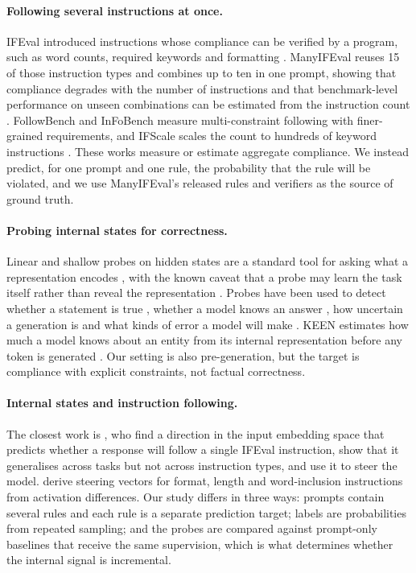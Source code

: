 \documentclass[10pt]{article}
\begin{document}
\paragraph{Following several instructions at once.} IFEval introduced instructions whose compliance can be verified by
a program, such as word counts, required keywords and formatting \citep{zhou2023ifeval}. ManyIFEval reuses 15 of those
instruction types and combines up to ten in one prompt, showing that compliance degrades with the number of
instructions and that benchmark-level performance on unseen combinations can be estimated from the instruction count
\citep{harada2025instructions}. FollowBench \citep{jiang2024followbench} and InFoBench \citep{qin2024infobench} measure
multi-constraint following with finer-grained requirements, and IFScale scales the count to hundreds of keyword
instructions \citep{jaroslawicz2025many}. These works measure or estimate aggregate compliance. We instead predict, for
one prompt and one rule, the probability that the rule will be violated, and we use ManyIFEval's released rules and
verifiers as the source of ground truth.

\paragraph{Probing internal states for correctness.} Linear and shallow probes on hidden states are a standard tool for
asking what a representation encodes \citep{alain2016probes,belinkov2022probing}, with the known caveat that a probe may
learn the task itself rather than reveal the representation \citep{hewitt2019control}. Probes have been used to detect
whether a statement is true \citep{azaria2023internal,burns2023discovering,marks2024geometry}, whether a model knows an
answer \citep{kadavath2022know}, how uncertain a generation is \citep{kossen2024sep} and what kinds of error a model
will make \citep{orgad2025llms}. KEEN estimates how much a model knows about an entity from its internal
representation before any token is generated \citep{gottesman2024estimating}. Our setting is also pre-generation, but
the target is compliance with explicit constraints, not factual correctness.

\paragraph{Internal states and instruction following.} The closest work is \citet{heo2025know}, who find a direction in
the input embedding space that predicts whether a response will follow a single IFEval instruction, show that it
generalises across tasks but not across instruction types, and use it to steer the model. \citet{stolfo2025steering}
derive steering vectors for format, length and word-inclusion instructions from activation differences. Our study
differs in three ways: prompts contain several rules and each rule is a separate prediction target; labels are
probabilities from repeated sampling; and the probes are compared against prompt-only baselines that receive the same
supervision, which is what determines whether the internal signal is incremental.
\end{document}
